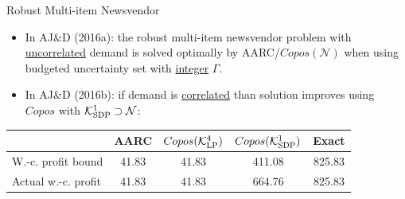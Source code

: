 \documentclass[xcolor=x11names,compress]{beamer}
\renewcommand{\(}{\begin{columns}}
\renewcommand{\)}{\end{columns}}
\newcommand{\<}[1]{\begin{column}{#1}}
\renewcommand{\>}{\end{column}}
\def\maximize{\mathop{\rm maximize}}
\def\min{\mathop{\rm min}}
\def\max{\mathop{\rm max}}
\newcommand{\X}{\mathcal{X}}
\newcommand{\0}{\V{0}}
\newcommand{\1}{\V{1}}
\newcommand{\mymbox}[1]{\mbox{\scriptsize #1}}
\newcommand{\N}{\mathcal{N}}
\begin{document}
\begin{frame}{Robust Multi-item Newsvendor}

\begin{itemize}
%
\item In AJ\&D (2016a): the robust multi-item newsvendor problem with \underline{uncorrelated} demand {\color{blue} is solved optimally} by AARC/$Copos(\N)$ when using  budgeted uncertainty set with \underline{integer} $\Gamma$.
%
\pause\vspace{0.5cm}\item In AJ\&D (2016b): if demand is \underline{correlated} than solution improves using $Copos$ with $\mathcal{K}_{\mymbox{SDP}}^1\supset \N$:
\end{itemize}
\vspace{-0.5cm}\begin{table}[H]
\centering{}%
\begin{tabular}{|l|c|c|c|c|}
\hline 
& AARC & $Copos(\mathcal{K}_{\mymbox{LP}}^4)$  & $Copos(\mathcal{K}_{\mymbox{SDP}}^1)$ & Exact \tabularnewline
 \hline
W.-c. profit bound& 41.83 & 41.83  & 411.08 & 825.83\tabularnewline
Actual w.-c. profit& 41.83 & 41.83 & 664.76 & 825.83 \tabularnewline
\hline 
\end{tabular}
\end{table}

\end{frame}
\end{document}
